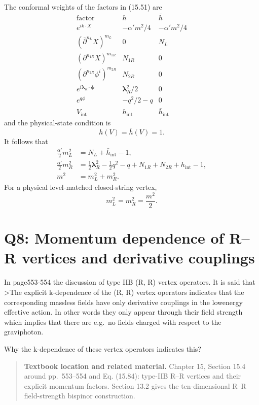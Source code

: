 \documentclass[
  10pt,
  a4paper,
  openany]{book}
\begin{document}
The conformal weights of the factors in (15.51) are \[
\begin{array}{c|c|c}
\text{factor}&h&\bar h\\ \hline
e^{ik\cdot X}&-\alpha'm^2/4&-\alpha'm^2/4\\
(\bar\partial^{n_L}X)^{m_L}&0&N_L\\
(\partial^{n_{1R}}X)^{m_{1R}}&N_{1R}&0\\
(\partial^{n_{2R}}\phi^i)^{m_{2R}}&N_{2R}&0\\
e^{i\boldsymbol\lambda_R\cdot\boldsymbol\phi}&\boldsymbol\lambda_R^2/2&0\\
e^{q\phi}&-q^2/2-q&0\\
V_{\mathrm{int}}&h_{\mathrm{int}}&\bar h_{\mathrm{int}}
\end{array}
\] and the physical-state condition is \[
h(V)=\bar h(V)=1.
\] It follows that \[
\boxed{
\begin{aligned}
\frac{\alpha'}2m_L^2
&=N_L+\bar h_{\mathrm{int}}-1,\\
\frac{\alpha'}2m_R^2
&=\frac12\boldsymbol\lambda_R^2
-\frac12q^2-q
+N_{1R}+N_{2R}
+h_{\mathrm{int}}-1,\\
m^2&=m_L^2+m_R^2.
\end{aligned}
}
\] For a physical level-matched closed-string vertex, \[
\boxed{
m_L^2=m_R^2=\frac{m^2}{2}.
}
\]

\section{Q8: Momentum dependence of R--R vertices and derivative
couplings}\label{q8-momentum-dependence-of-rr-vertices-and-derivative-couplings}

In page553-554 the discussion of type IIB (R, R) vertex operators. It is
said that \textgreater The explicit k-dependence of the (R, R) vertex
operators indicates that the corresponding massless fields have only
derivative couplings in the lowenergy effective action. In other words
they only appear through their field strength which implies that there
are e.g.~no fields charged with respect to the graviphoton.

Why the k-dependence of these vertex operators indicates this?

\begin{quote}
\textbf{Textbook location and related material.} Chapter 15, Section
15.4 around pp.~553--554 and Eq. (15.84): type-IIB R--R vertices and
their explicit momentum factors. Section 13.2 gives the ten-dimensional
R--R field-strength bispinor construction.
\end{quote}
\end{document}
